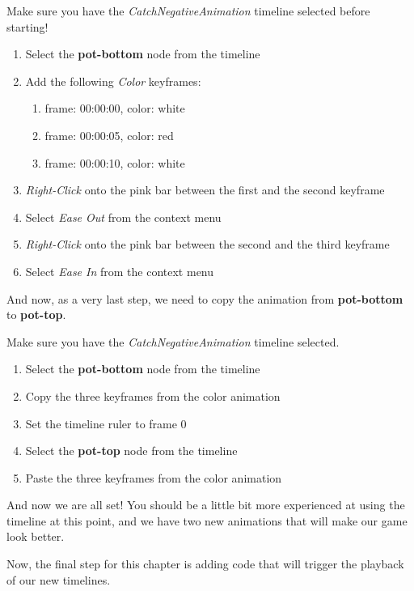 \begin{leftbar}
Make sure you have the \textit{CatchNegativeAnimation} timeline selected before
starting!
\begin{enumerate}
  \item Select the \textbf{pot-bottom} node from the timeline
  \item Add the following \textit{Color} keyframes:
  \begin{enumerate}
    \item frame: 00:00:00, color: white
    \item frame: 00:00:05, color: red
    \item frame: 00:00:10, color: white 
  \end{enumerate}
  \item \textit{Right-Click} onto the pink bar between the first and the second
  keyframe
  \item Select \textit{Ease Out} from the context menu
  \item \textit{Right-Click} onto the pink bar between the second and the third
  keyframe
  \item Select \textit{Ease In} from the context menu
\end{enumerate}
\end{leftbar}

And now, as a very last step, we need to copy the animation from
\textbf{pot-bottom} to \textbf{pot-top}.

\begin{leftbar}
Make sure you have the \textit{CatchNegativeAnimation} timeline selected.
\begin{enumerate}
  \item Select the \textbf{pot-bottom} node from the timeline
  \item Copy the three keyframes from the color animation
  \item Set the timeline ruler to frame 0
  \item Select the \textbf{pot-top} node from the timeline
  \item Paste the three keyframes from the color animation
\end{enumerate}
\end{leftbar}

And now we are all set! You should be a little bit more experienced at using the
timeline at this point, and we have two new animations that will make our game
look better.

Now, the final step for this chapter is adding code that will trigger the
playback of our new timelines.

